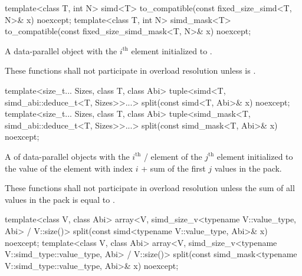 \begin{itemdecl}
template<class T, int N> simd<T> to_compatible(const fixed_size_simd<T, N>& x) noexcept;
template<class T, int N> simd_mask<T> to_compatible(const fixed_size_simd_mask<T, N>& x) noexcept;
\end{itemdecl}

\begin{itemdescr}
  \pnum\returns
  A data-parallel object with the $i^\text{th}$ element initialized to  \foralli.

  \pnum\remarks
  These functions shall not participate in overload resolution unless  is .
\end{itemdescr}

\begin{itemdecl}
template<size_t... Sizes, class T, class Abi>
  tuple<simd<T, simd_abi::deduce_t<T, Sizes>>...>
    split(const simd<T, Abi>& x) noexcept;
template<size_t... Sizes, class T, class Abi>
  tuple<simd_mask<T, simd_abi::deduce_t<T, Sizes>>...>
    split(const simd_mask<T, Abi>& x) noexcept;
\end{itemdecl}

\begin{itemdescr}
  \pnum\returns
  A  of data-parallel objects with the $i^\text{th}$ / element of the $j^\text{th}$  element initialized to the value of the element  with index $i$ + sum of the first $j$ values in the  pack.

  \pnum\remarks
  These functions shall not participate in overload resolution unless the sum of all values in the  pack is equal to .
\end{itemdescr}

\begin{itemdecl}
template<class V, class Abi>
  array<V, simd_size_v<typename V::value_type, Abi> / V::size()>
    split(const simd<typename V::value_type, Abi>& x) noexcept;
template<class V, class Abi>
  array<V, simd_size_v<typename V::simd_type::value_type, Abi> / V::size()>
    split(const simd_mask<typename V::simd_type::value_type, Abi>& x) noexcept;
\end{itemdecl}

